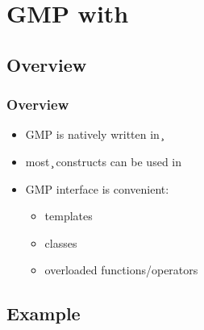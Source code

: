 \section{GMP with \cpp}

\subsection{Overview}

\begin{frame}
\frametitle{Overview}
\begin{itemize}
\item GMP is natively written in \c
\item most \c{} constructs can be used in \cpp
\item GMP \cpp{} interface is convenient:
  \begin{itemize}
  \item templates
  \item classes
  \item overloaded functions/operators
  \end{itemize}
\end{itemize}
\end{frame}

\subsection{Example}

\begin{frame}
\frametitle{}

\end{frame}
\begin{frame}
\frametitle{}

\end{frame}

\begin{frame}
\frametitle{}

\end{frame}
\begin{frame}
\frametitle{}

\end{frame}
\begin{frame}
\frametitle{}

\end{frame}

